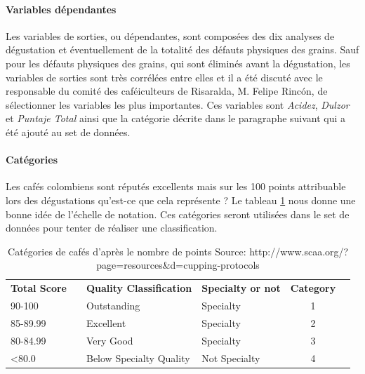 \paragraph{Variables dépendantes\label{VarDep}} Les variables de sorties, ou dépendantes, sont composées des dix analyses de dégustation et éventuellement de la totalité des défauts physiques des grains. Sauf pour les défauts physiques des grains, qui sont éliminés avant la dégustation, les variables de sorties sont très corrélées entre elles et il a été discuté avec le responsable du comité des caféiculteurs de Risaralda, M. Felipe Rincón, de sélectionner les variables les plus importantes. Ces variables sont \textit{Acidez}, \textit{Dulzor} et \textit{Puntaje Total} ainsi que la catégorie décrite dans le paragraphe suivant qui a été ajouté au set de données.  

\paragraph{Catégories}
Les cafés colombiens sont réputés excellents mais sur les 100 points attribuable lors des dégustations qu'est-ce que cela représente ? Le tableau \ref{categoriesCafe} nous donne une bonne idée de l'échelle de notation. Ces catégories seront utilisées dans le set de données pour tenter de réaliser une classification. 
\begin{table}[H]
	\centering
	\caption{Catégories de cafés d'après le nombre de points \newline Source: http://www.scaa.org/?page=resources\&d=cupping-protocols \label{categoriesCafe}}
	\begin{tabular}{llllcl}
		\textbf{Total Score}   &  & \textbf{Quality Classification}   & \textbf{Specialty or not}  & \textbf{Category} \\
		
		90-100        &  & Outstanding              & Specialty         &  1                    \\
		85-89.99      &  & Excellent                & Specialty         &  2                    \\
		80-84.99      &  & Very Good                & Specialty         &  3                    \\
		\textless80.0 &  & Below Specialty Quality & Not Specialty     &  4                   
	\end{tabular}
\end{table}



